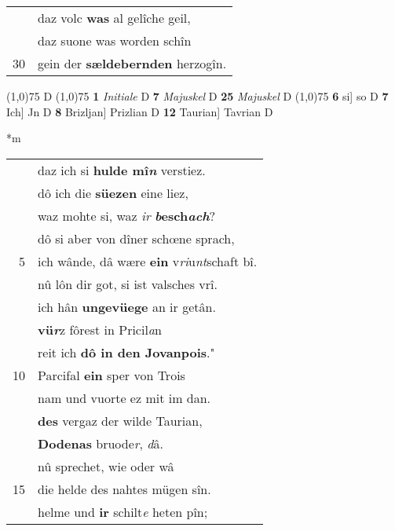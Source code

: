 \documentclass[8pt,a4paper,notitlepage]{article}
\begin{document}
\begin{table}[ht]
\begin{minipage}[t]{0.5\linewidth}
\begin{tabular}{rl}
 & daz volc \textbf{was} al gelîche geil,\\ 
 & daz suone was worden schîn\\ 
30 & gein der \textbf{sældebernden} herzogîn.\\ 
\end{tabular}
\scriptsize
\line(1,0){75} \newline
D \newline
\line(1,0){75} \newline
\textbf{1} \textit{Initiale} D  \textbf{7} \textit{Majuskel} D  \textbf{25} \textit{Majuskel} D  \newline
\line(1,0){75} \newline
\textbf{6} si] so D \textbf{7} Ich] Jn D \textbf{8} Brizljan] Prizlian D \textbf{12} Taurian] Tavrian D \newline
\end{minipage}
\hspace{0.5cm}
\begin{minipage}[t]{0.5\linewidth}
\small
\begin{center}*m
\end{center}
\begin{tabular}{rl}
 & daz ich si \textbf{hulde mî\textit{n}} verstiez.\\ 
 & dô ich die \textbf{süezen} eine liez,\\ 
 & waz mohte si, waz \textit{ir} \textbf{\textit{b}esch\textit{ach}}?\\ 
 & dô si aber von dîner schœne sprach,\\ 
5 & ich wânde, dâ wære \textbf{ein} v\textit{ri}u\textit{nt}schaft bî.\\ 
 & nû lôn dir got, si ist valsches vrî.\\ 
 & ich hân \textbf{ungevüege} an ir getân.\\ 
 & \textbf{vü\textit{r}}z fôrest in Pricil\textit{a}n\\ 
 & reit ich \textbf{dô in den Jovanpois}."\\ 
10 & Parcifal \textbf{ein} sper von Trois\\ 
 & nam und vuorte ez mit im dan.\\ 
 & \textbf{des} vergaz der wilde Taurian,\\ 
 & \textbf{Dodenas} bruode\textit{r}, \textit{d}â.\\ 
 & nû sprechet, wie oder wâ\\ 
15 & die helde des nahtes mügen sîn.\\ 
 & helme und \textbf{ir} schilt\textit{e} heten pîn;\\ 

\end{tabular}
\end{minipage}
\end{table}
\end{document}
